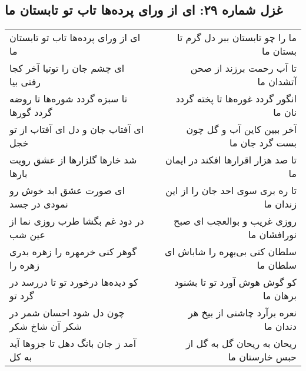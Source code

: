 \begin{center}
\section*{غزل شماره ۲۹: ای از ورای پرده‌ها تاب تو تابستان ما}
\label{sec:0029}
\begin{longtable}{l p{0.5cm} r}
ای از ورای پرده‌ها تاب تو تابستان ما
&&
ما را چو تابستان ببر دل گرم تا بستان ما
\\
ای چشم جان را توتیا آخر کجا رفتی بیا
&&
تا آب رحمت برزند از صحن آتشدان ما
\\
تا سبزه گردد شوره‌ها تا روضه گردد گورها
&&
انگور گردد غوره‌ها تا پخته گردد نان ما
\\
ای آفتاب جان و دل ای آفتاب از تو خجل
&&
آخر ببین کاین آب و گل چون بست گرد جان ما
\\
شد خارها گلزارها از عشق رویت بارها
&&
تا صد هزار اقرارها افکند در ایمان ما
\\
ای صورت عشق ابد خوش رو نمودی در جسد
&&
تا ره بری سوی احد جان را از این زندان ما
\\
در دود غم بگشا طرب روزی نما از عین شب
&&
روزی غریب و بوالعجب ای صبح نورافشان ما
\\
گوهر کنی خرمهره را زهره بدری زهره را
&&
سلطان کنی بی‌بهره را شاباش ای سلطان ما
\\
کو دیده‌ها درخورد تو تا دررسد در گرد تو
&&
کو گوش هوش آورد تو تا بشنود برهان ما
\\
چون دل شود احسان شمر در شکر آن شاخ شکر
&&
نعره برآرد چاشنی از بیخ هر دندان ما
\\
آمد ز جان بانگ دهل تا جزوها آید به کل
&&
ریحان به ریحان گل به گل از حبس خارستان ما
\\
\end{longtable}
\end{center}
